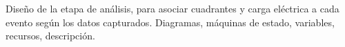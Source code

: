 Diseño de la etapa de análisis, para asociar cuadrantes y carga eléctrica a cada evento según los datos capturados. Diagramas, máquinas de estado, variables, recursos, descripción.